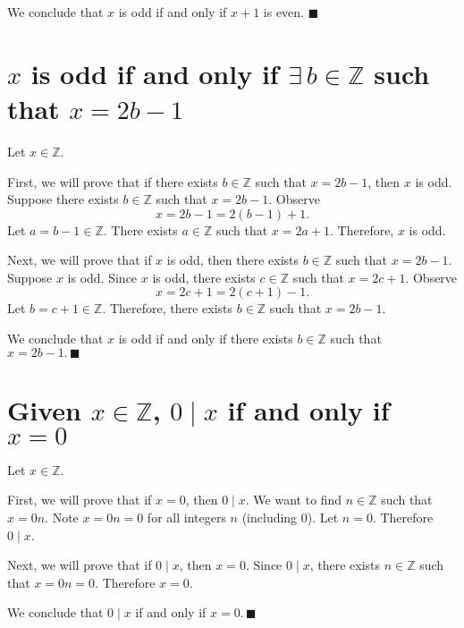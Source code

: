 \documentclass[12pt]{article}
\begin{document}
We conclude that $x$ is odd if and only if $x+1$ is even. $\blacksquare$
\section{$x$ is odd if and only if $\exists\,b\in\mathbb{Z}$ such that $x=2b-1$}
Let $x\in\mathbb{Z}$. 

First, we will prove that if there exists $b\in\mathbb{Z}$ such that $x=2b-1$, then $x$ is odd. Suppose there exists $b\in\mathbb{Z}$ such that $x=2b-1$. Observe
\[x=2b-1=2(b-1)+1.\]
Let $a=b-1\in\mathbb{Z}$. There exists $a\in\mathbb{Z}$ such that $x=2a+1$. Therefore, $x$ is odd.

Next, we will prove that if $x$ is odd, then there exists $b\in\mathbb{Z}$ such that $x=2b-1$. Suppose $x$ is odd. Since $x$ is odd, there exists $c\in\mathbb{Z}$ such that $x=2c+1$. Observe
\[x=2c+1=2(c+1)-1.\]
Let $b=c+1\in\mathbb{Z}$. Therefore, there exists $b\in\mathbb{Z}$ such that $x=2b-1$.

We conclude that $x$ is odd if and only if there exists $b\in\mathbb{Z}$ such that $x=2b-1.\,\blacksquare$
\section{Given $x\in\mathbb{Z}$, $0 \mid x$ if and only if $x=0$}
Let $x\in\mathbb{Z}$.

First, we will prove that if $x=0$, then $0 \mid x$. We want to find $n\in\mathbb{Z}$ such that $x=0n$. Note $x=0n=0$ for all integers $n$ (including 0). Let $n=0$. Therefore $0 \mid x$.

Next, we will prove that if $0 \mid x$, then $x=0$. Since $0 \mid x$, there exists $n\in\mathbb{Z}$ such that $x=0n=0$. Therefore $x=0$.

We conclude that $0 \mid x$ if and only if $x=0.\,\blacksquare$
\end{document}
